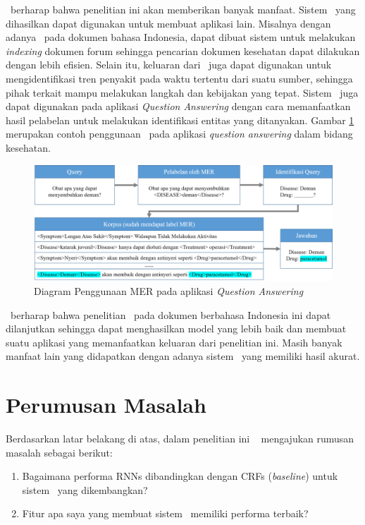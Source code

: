 	\Saya~berharap bahwa penelitian ini akan memberikan banyak manfaat. Sistem \mer~yang dihasilkan dapat digunakan untuk membuat aplikasi lain. Misalnya dengan adanya \mer~pada dokumen bahasa Indonesia, dapat dibuat sistem untuk melakukan \textit{indexing} dokumen forum sehingga pencarian dokumen kesehatan dapat dilakukan dengan lebih efisien. Selain itu, keluaran dari \mer~juga dapat digunakan untuk mengidentifikasi tren penyakit pada waktu tertentu dari suatu sumber, sehingga pihak terkait mampu melakukan langkah dan kebijakan yang tepat. Sistem \mer~juga dapat digunakan pada aplikasi \textit{Question Answering} \citep{abacha2011medical} dengan cara memanfaatkan hasil pelabelan untuk melakukan identifikasi entitas yang ditanyakan. Gambar \ref{fig:merforqa} merupakan contoh penggunaan \mer~pada aplikasi \textit{question answering} dalam bidang kesehatan.
	
	\begin{figure}
		\centering
		\includegraphics[width=\linewidth]{images/merforqa}
		\caption{Diagram Penggunaan MER pada aplikasi \textit{Question Answering}}
		\label{fig:merforqa}
	\end{figure}
	
	\Saya~berharap bahwa penelitian \mer~pada dokumen berbahasa Indonesia ini dapat dilanjutkan sehingga dapat menghasilkan model yang lebih baik dan membuat suatu aplikasi yang memanfaatkan keluaran dari penelitian ini. Masih banyak manfaat lain yang didapatkan dengan adanya sistem \mer~yang memiliki hasil akurat. 

\section{Perumusan Masalah}
Berdasarkan latar belakang di atas, dalam penelitian ini \saya~ mengajukan rumusan masalah sebagai berikut:
\begin{enumerate}
	\item Bagaimana performa RNNs dibandingkan dengan CRFs (\textit{baseline}) untuk sistem \mer~yang dikembangkan?
	\item Fitur apa saya yang membuat sistem \mer~memiliki performa terbaik?
\end{enumerate}


